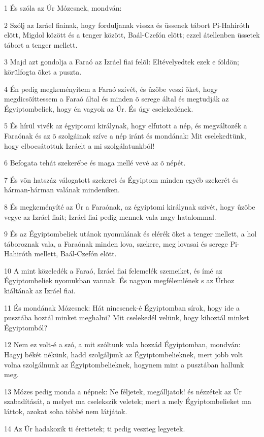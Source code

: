 \par 1 És szóla az Úr Mózesnek, mondván:
\par 2 Szólj az Izráel fiainak, hogy forduljanak vissza és üssenek tábort Pi-Hahiróth elõtt, Migdol között és a tenger között, Baál-Czefón elõtt; ezzel átellenben üssetek tábort a tenger mellett.
\par 3 Majd azt gondolja a Faraó az Izráel fiai felõl: Eltévelyedtek ezek e földön; körülfogta õket a puszta.
\par 4 Én pedig megkeményítem a Faraó szívét, és ûzõbe veszi õket, hogy megdicsõíttessem a Faraó által és minden õ serege által és megtudják az Égyiptombeliek, hogy én vagyok az Úr. És úgy cselekedének.
\par 5 És hírül vivék az égyiptomi királynak, hogy elfutott a nép, és megváltozék a Faraónak és az õ szolgáinak szíve a nép iránt és mondának: Mit cselekedtünk, hogy elbocsátottuk Izráelt a mi szolgálatunkból!
\par 6 Befogata tehát szekerébe és maga mellé vevé az õ népét.
\par 7 És võn hatszáz válogatott szekeret és Égyiptom minden egyéb szekerét és hárman-hárman valának mindeniken.
\par 8 És megkeményíté az Úr a Faraónak, az égyiptomi királynak szivét, hogy ûzõbe vegye az Izráel fiait; Izráel fiai pedig mennek vala nagy hatalommal.
\par 9 És az Égyiptombeliek utánok nyomulának és elérék õket a tenger mellett, a hol táboroznak vala, a Faraónak minden lova, szekere, meg lovasai és serege Pi-Hahiróth mellett, Baál-Czefón elõtt.
\par 10 A mint közeledék a Faraó, Izráel fiai felemelék szemeiket, és ímé az Égyiptombeliek nyomukban vannak. És nagyon megfélemlének s az Úrhoz kiáltának az Izráel fiai.
\par 11 És mondának Mózesnek: Hát nincsenek-é Égyiptomban sírok, hogy ide a pusztába hoztál minket meghalni? Mit cselekedél velünk, hogy kihoztál minket Égyiptomból?
\par 12 Nem ez volt-é a szó, a mit szóltunk vala hozzád Égyiptomban, mondván: Hagyj békét nékünk, hadd szolgáljunk az Égyiptombelieknek, mert jobb volt volna szolgálnunk az Égyiptombelieknek, hogynem mint a pusztában hallunk meg.
\par 13 Mózes pedig monda a népnek: Ne féljetek, megálljatok! és nézzétek az Úr szabadítását, a melyet ma cselekszik veletek; mert a mely Égyiptombelieket ma láttok, azokat soha többé nem látjátok.
\par 14 Az Úr hadakozik ti érettetek; ti pedig veszteg legyetek.
